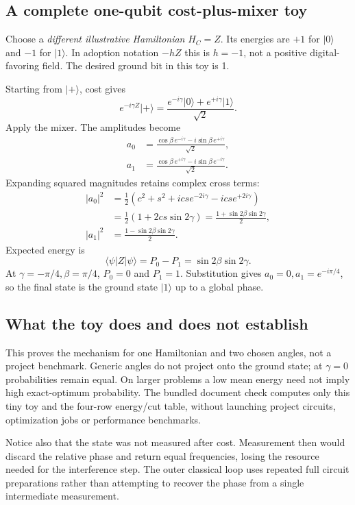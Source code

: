 \documentclass[11pt,letterpaper]{article}
\newcommand{\ket}[1]{\lvert #1\rangle}
\newcommand{\bra}[1]{\langle #1\rvert}
\begin{document}
\subsection{A complete one-qubit cost-plus-mixer toy}\label{sec:toy}
Choose a \emph{different illustrative Hamiltonian} $H_C=Z$. Its energies are $+1$ for $\ket0$ and $-1$ for $\ket1$. In adoption notation $-hZ$ this is $h=-1$, not a positive digital-favoring field. The desired ground bit in this toy is 1.

Starting from $\ket+$, cost gives
\[
 e^{-i\gamma Z}\ket+=\frac{e^{-i\gamma}\ket0+e^{+i\gamma}\ket1}{\sqrt2}.
\]
Apply the mixer. The amplitudes become
\begin{align}
 a_0&=\frac{\cos\beta\,e^{-i\gamma}-i\sin\beta\,e^{+i\gamma}}{\sqrt2},\\
 a_1&=\frac{\cos\beta\,e^{+i\gamma}-i\sin\beta\,e^{-i\gamma}}{\sqrt2}.
\end{align}
Expanding squared magnitudes retains complex cross terms:
\begin{align}
 |a_0|^2&=\tfrac12\left(c^2+s^2+ics e^{-2i\gamma}-ics e^{+2i\gamma}\right)\\
 &=\tfrac12(1+2cs\sin2\gamma)
 =\frac{1+\sin2\beta\sin2\gamma}{2},\\
 |a_1|^2&=\frac{1-\sin2\beta\sin2\gamma}{2}.\label{eq:toyprobs}
\end{align}
Expected energy is
\begin{equation}
 \bra\psi Z\ket\psi=P_0-P_1=\sin2\beta\sin2\gamma.
\end{equation}
At $\gamma=-\pi/4,\beta=\pi/4$, $P_0=0$ and $P_1=1$. Substitution gives $a_0=0,a_1=e^{-i\pi/4}$, so the final state is the ground state $\ket1$ up to a global phase.

\subsection{What the toy does and does not establish}
This proves the mechanism for one Hamiltonian and two chosen angles, not a project benchmark. Generic angles do not project onto the ground state; at $\gamma=0$ probabilities remain equal. On larger problems a low mean energy need not imply high exact-optimum probability. The bundled document check computes only this tiny toy and the four-row energy/cut table, without launching project circuits, optimization jobs or performance benchmarks.

Notice also that the state was not measured after cost. Measurement then would discard the relative phase and return equal frequencies, losing the resource needed for the interference step. The outer classical loop uses repeated full circuit preparations rather than attempting to recover the phase from a single intermediate measurement.
\end{document}
